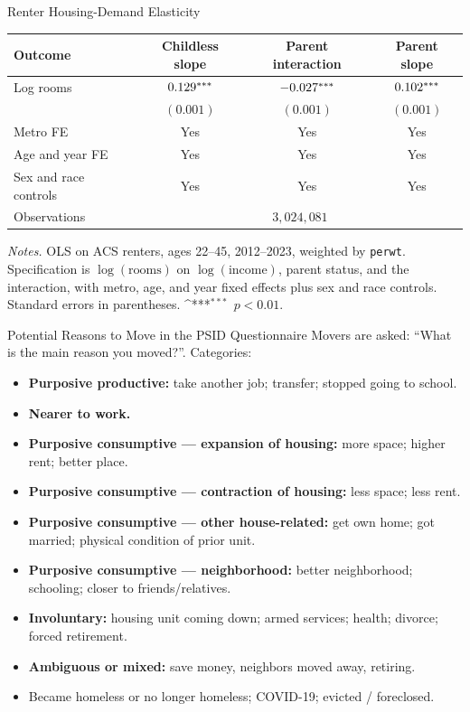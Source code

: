 \documentclass[11pt,aspectratio=169]{beamer}
\newcommand{\sym}[1]{\ifmmode^{#1}\else\(^{#1}\)\fi}
\begin{document}
\begin{frame}{Renter Housing-Demand Elasticity \; \hyperlink{acs_elasticity_body}{}}
\label{acs_elasticity_reg}
\begin{table}[htbp]\centering
\scriptsize
\begin{tabular}{lccc}
\toprule
Outcome & Childless slope & Parent interaction & Parent slope \\
\midrule
Log rooms & $0.129\sym{***}$ & $-0.027\sym{***}$ & $0.102\sym{***}$ \\
          & $(0.001)$ & $(0.001)$ & $(0.001)$ \\
\midrule
Metro FE & Yes & Yes & Yes \\
Age and year FE & Yes & Yes & Yes \\
Sex and race controls & Yes & Yes & Yes \\
Observations & \multicolumn{3}{c}{$3{,}024{,}081$} \\
\bottomrule
\end{tabular}
\end{table}
\vspace{-0.7em}
\begin{flushleft}\tiny
\textit{Notes.} OLS on ACS renters, ages 22--45, 2012--2023, weighted by \texttt{perwt}. Specification is $\log(\text{rooms})$ on $\log(\text{income})$, parent status, and the interaction, with metro, age, and year fixed effects plus sex and race controls. Standard errors in parentheses. \sym{***}~$p<0.01$.
\end{flushleft}
\end{frame}

\begin{frame}{Potential Reasons to Move in the PSID Questionnaire \; \hyperlink{psid_moves_body}{}}
\label{psid_reasons_questionnaire}
\footnotesize
Movers are asked: ``What is the main reason you moved?''. Categories:
\begin{itemize}
  \item \textbf{Purposive productive:} take another job; transfer; stopped going to school.
  \item \textbf{Nearer to work.}
  \item \textbf{Purposive consumptive --- expansion of housing:} more space; higher rent; better place.
  \item \textbf{Purposive consumptive --- contraction of housing:} less space; less rent.
  \item \textbf{Purposive consumptive --- other house-related:} get own home; got married; physical condition of prior unit.
  \item \textbf{Purposive consumptive --- neighborhood:} better neighborhood; schooling; closer to friends/relatives.
  \item \textbf{Involuntary:} housing unit coming down; armed services; health; divorce; forced retirement.
  \item \textbf{Ambiguous or mixed:} save money, neighbors moved away, retiring.
  \item Became homeless or no longer homeless; COVID-19; evicted / foreclosed.
\end{itemize}
\end{frame}
\end{document}
